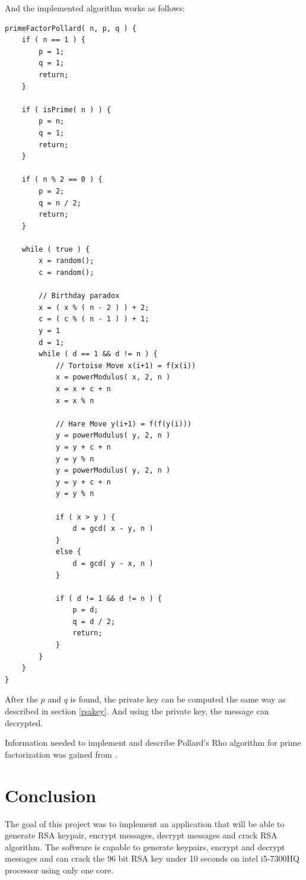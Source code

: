 \documentclass[11pt,a4paper,titlepage]{article}
\begin{document}
        And the implemented algorithm works as follows:
\begin{lstlisting}[style=CStyle]
primeFactorPollard( n, p, q ) {
    if ( n == 1 ) {
        p = 1;
        q = 1;
        return;
    }
    
    if ( isPrime( n ) ) {
        p = n;
        q = 1;
        return;
    }
    
    if ( n % 2 == 0 ) {
        p = 2;
        q = n / 2;
        return;
    }
    
    while ( true ) {
        x = random();
        c = random();
        
        // Birthday paradox
        x = ( x % ( n - 2 ) ) + 2;
        c = ( c % ( n - 1 ) ) + 1;
        y = 1
        d = 1;
        while ( d == 1 && d != n ) {
            // Tortoise Move x(i+1) = f(x(i))
            x = powerModulus( x, 2, n )
            x = x + c + n
            x = x % n
            
            // Hare Move y(i+1) = f(f(y(i)))
            y = powerModulus( y, 2, n )
            y = y + c + n
            y = y % n
            y = powerModulus( y, 2, n )
            y = y + c + n
            y = y % n
            
            if ( x > y ) {
                d = gcd( x - y, n )
            }
            else {
                d = gcd( y - x, n )
            }
            
            if ( d != 1 && d != n ) {
                p = d;
                q = d / 2;
                return;
            }
        }
    }
}
\end{lstlisting}
        
        After the $p$ and $q$ is found, the private key can be computed the same way as described in section \ref{rsakey}. And using the private key, the message can decrypted.
        
        Information needed to implement and describe Pollard’s Rho algorithm for prime factorization was gained from \cite{web:geeks}.
        
    \section{Conclusion}
        The goal of this project was to implement an application that will be able to generate RSA keypair, encrypt messages, decrypt messages and crack RSA algorithm. The software is capable to generate keypairs, encrypt and decrypt messages and can crack the 96 bit RSA key under 10 seconds on intel i5-7300HQ processor using only one core.
    \newpage
    
\end{document}

